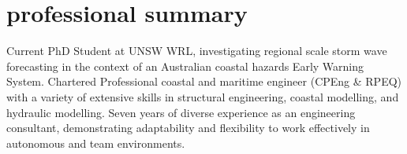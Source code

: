 \section{professional summary}
\begin{adjustwidth}{2cm}{}
  Current PhD Student at UNSW WRL, investigating regional scale storm wave forecasting in the context of an Australian coastal hazards Early Warning System.
  Chartered Professional coastal and maritime engineer (CPEng \& RPEQ) with a variety of extensive skills in structural engineering, coastal modelling, and hydraulic modelling.
  Seven years of diverse experience as an engineering consultant, demonstrating adaptability and flexibility to work effectively in autonomous and team environments.\\
  \vspace{-2\parskip}
\end{adjustwidth}